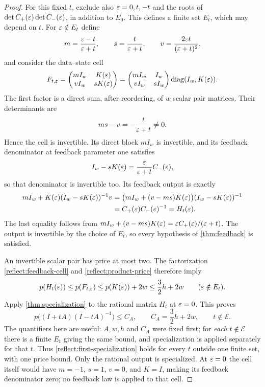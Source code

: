\begin{proof}
For this fixed $t$, exclude also $\varepsilon=0,t,-t$ and the roots of
$\det C_+(\varepsilon)\det C_-(\varepsilon)$, in addition to $E_0$.
This defines a finite set $E_t$, which may depend on $t$.
For $\varepsilon\notin E_t$ define
\[
 m=\frac{\varepsilon-t}{\varepsilon+t},\qquad
 s=\frac{t}{\varepsilon+t},\qquad
 v=\frac{2\varepsilon t}{(\varepsilon+t)^2},
\]
and consider the data--state cell
\begin{equation}
 F_{t,\varepsilon}=
 \begin{pmatrix}mI_w&K(\varepsilon)\\vI_w&sK(\varepsilon)\end{pmatrix}
 =\begin{pmatrix}mI_w&I_w\\vI_w&sI_w\end{pmatrix}
   \operatorname{diag}(I_w,K(\varepsilon)).
 \label{reflect:feedback-cell}
\end{equation}
The first factor is a direct sum, after reordering, of $w$ scalar
pair matrices.  Their determinants are
\[
 ms-v=-\frac{t}{\varepsilon+t}\ne0.
\]
Hence the cell is invertible.  Its direct block $mI_w$ is invertible,
and its feedback denominator at feedback parameter one satisfies
\begin{equation}
 I_w-sK(\varepsilon)=\frac{\varepsilon}{\varepsilon+t}C_-(\varepsilon),
 \label{reflect:feedback-denominator}
\end{equation}
so that denominator is invertible too.  Its feedback output is exactly
\begin{align*}
 mI_w+K(\varepsilon)(I_w-sK(\varepsilon))^{-1}v
 &=\bigl(mI_w+(v-ms)K(\varepsilon)\bigr)
                         (I_w-sK(\varepsilon))^{-1}\\
 &=C_+(\varepsilon)C_-(\varepsilon)^{-1}=H_t(\varepsilon).
\end{align*}
The last equality follows from
$mI_w+(v-ms)K(\varepsilon)=\varepsilon C_+(\varepsilon)/(\varepsilon+t)$.
The output is invertible by the choice of $E_t$, so every hypothesis
of \cref{thm:feedback} is satisfied.

An invertible scalar pair has price at most two.  The factorization
\eqref{reflect:feedback-cell} and \eqref{reflect:product-price}
therefore imply
\[
 p(H_t(\varepsilon))\leq p(F_{t,\varepsilon})
              \leq p(K(\varepsilon))+2w
              \leq \frac32h+2w
              \qquad(\varepsilon\notin E_t).
\]
Apply \cref{thm:specialization} to the rational matrix $H_t$ at
$\varepsilon=0$.  This proves
\begin{equation}
 p\bigl((I+tA)(I-tA)^{-1}\bigr)\leq C_A,
 \qquad C_A=\frac32h+2w,
 \qquad t\notin\mathcal E.
 \label{reflect:first-specialization}
\end{equation}
The quantifiers here are useful: $A,w,h$ and $C_A$ were fixed first;
for \emph{each} $t\notin\mathcal E$ there is a finite $E_t$ giving
the same bound, and specialization is applied separately for that
$t$.  Thus \eqref{reflect:first-specialization} holds for every
$t$ outside one finite set, with one price bound.
Only the rational output is specialized.  At $\varepsilon=0$ the cell
itself would have $m=-1$, $s=1$, $v=0$, and $K=I$, making its
feedback denominator zero; no feedback law is applied to that cell.


\end{proof}
